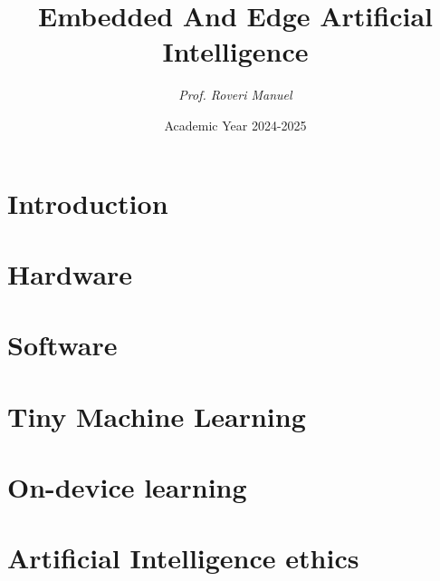 \documentclass[12pt, a4paper]{report}
\title{\textbf{Embedded And Edge Artificial Intelligence}}
\author{\textit{Prof. Roveri Manuel}}
\date{Academic Year 2024-2025}
\begin{document}
    \maketitle

    

    \cleardoublepage

    \tableofcontents

    \cleardoublepage

    \chapter{Introduction}
    
    

    \chapter{Hardware}
    
    
    
    

    \chapter{Software}
    
    
    

    \chapter{Tiny Machine Learning}
    
    
    
    
    

    \chapter{On-device learning}
    
    

    \chapter{Artificial Intelligence ethics}
    
    
    
\end{document}
